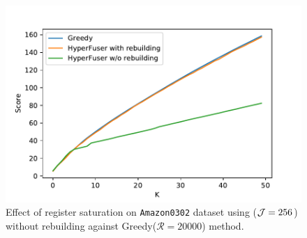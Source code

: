 \begin{figure}[!ht]
    \begin{center}
    \includegraphics[width=\linewidth]{images/sketch-saturation.pdf}
    \caption{ Effect of register saturation on {\tt Amazon0302} dataset using \acro(${\cal J}=256$) without rebuilding against Greedy($\mathcal{R}=20000$) method\cite{kempe2003maximizing}. %
     }\label{fig:sketch-saturation} 
    \end{center}
\end{figure}



